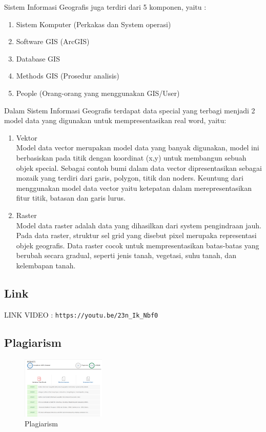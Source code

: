     \par Sistem Informasi Geografis juga terdiri dari 5 komponen, yaitu :
    \begin{enumerate}
        \item Sistem Komputer (Perkakas dan System operasi)
        \item Software GIS (ArcGIS)
        \item Database GIS
        \item Methods GIS (Prosedur analisis)
        \item People (Orang-orang yang menggunakan GIS/User)
    \end{enumerate}
    \par Dalam Sistem Informasi Geografis terdapat data special yang terbagi menjadi 2 model data yang digunakan untuk mempresentasikan real word, yaitu:
    \begin{enumerate}
        \item Vektor\\
        Model data vector merupakan model data yang banyak digunakan, model ini berbasiskan pada titik dengan koordinat (x,y) untuk membangun sebuah objek special. Sebagai contoh bumi dalam data vector dipresentasikan sebagai mozaik yang terdiri dari garis, polygon, titik dan noders. Keuntung dari menggunakan model data vector yaitu ketepatan dalam merepresentasikan fitur titik, batasan dan garis  lurus.
        \item Raster\\
        Model data raster adalah data yang dihasilkan dari system pengindraan jauh. Pada data raster, struktur sel grid yang disebut pixel  merupaka representasi objek geografis. Data raster cocok untuk mempresentasikan batas-batas yang berubah secara gradual, seperti jenis tanah, vegetasi, suhu tanah, dan kelembapan tanah.
    \end{enumerate}
    \subsection{Link}
    LINK VIDEO :  \texttt{https://youtu.be/23n\_Ik\_Nbf0}
    \subsection{Plagiarism}
    \begin{figure}[H]
	\includegraphics[width=4cm]{figures/Tugas1/1174084/plagiarism.png}
	\centering
	\caption{Plagiarism}
    \end{figure}
 
